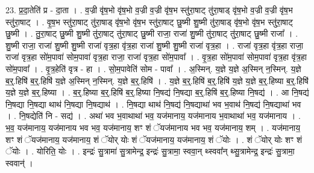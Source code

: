 \documentclass[17pt]{extarticle}
\begin{document}
23. प्र॒दा॒तेति॑ प्र - दा॒ता । . व॒ज्री वृ॑ष॒भो वृ॑ष॒भो व॒ज्री व॒ज्री वृ॑ष॒भ स्तु॑रा॒षाट् तु॑रा॒षाड् वृ॑ष॒भो व॒ज्री व॒ज्री वृ॑ष॒भ स्तु॑रा॒षाट् । . वृ॒ष॒भ स्तु॑रा॒षाट् तु॑रा॒षाड् वृ॑ष॒भो वृ॑ष॒भ स्तु॑रा॒षाट् छु॒ष्मी शु॒ष्मी तु॑रा॒षाड् वृ॑ष॒भो वृ॑ष॒भ स्तु॑रा॒षाट् छु॒ष्मी । . तु॒रा॒षाट् छु॒ष्मी शु॒ष्मी तु॑रा॒षाट् तु॑रा॒षाट् छु॒ष्मी राजा॒ राजा॑ शु॒ष्मी तु॑रा॒षाट् तु॑रा॒षाट् छु॒ष्मी राजा᳚ । . शु॒ष्मी राजा॒ राजा॑ शु॒ष्मी शु॒ष्मी राजा॑ वृत्र॒हा वृ॑त्र॒हा राजा॑ शु॒ष्मी शु॒ष्मी राजा॑ वृत्र॒हा । . राजा॑ वृत्र॒हा वृ॑त्र॒हा राजा॒ राजा॑ वृत्र॒हा सो॑म॒पावा॑ सोम॒पावा॑ वृत्र॒हा राजा॒ राजा॑ वृत्र॒हा सो॑म॒पावा᳚ । . वृ॒त्र॒हा सो॑म॒पावा॑ सोम॒पावा॑ वृत्र॒हा वृ॑त्र॒हा सो॑म॒पावा᳚ । . वृ॒त्र॒हेति॑ वृत्र - हा । . सो॒म॒पावेति॑ सोम - पावा᳚ । . अ॒स्मिन्. य॒ज्ञे य॒ज्ञे अ॒स्मिन् न॒स्मिन्. य॒ज्ञे ब॒र्॒.हिषि॑ ब॒र्॒.हिषि॑ य॒ज्ञे अ॒स्मिन् न॒स्मिन्. य॒ज्ञे ब॒र्॒.हिषि॑ । . य॒ज्ञे ब॒र्॒.हिषि॑ ब॒र्॒.हिषि॑ य॒ज्ञे य॒ज्ञे ब॒र्॒.हिष्या ब॒र्॒.हिषि॑ य॒ज्ञे य॒ज्ञे ब॒र्॒.हिष्या । . ब॒र्॒.हिष्या ब॒र्॒.हिषि॑ ब॒र्॒.हिष्या नि॒षद्य॑ नि॒षद्या ब॒र्॒.हिषि॑ ब॒र्॒.हिष्या नि॒षद्य॑ । . आ नि॒षद्य॑ नि॒षद्या नि॒षद्या थाथ॑ नि॒षद्या नि॒षद्याथ॑ । . नि॒षद्या थाथ॑ नि॒षद्य॑ नि॒षद्याथा॑ भव भ॒वाथ॑ नि॒षद्य॑ नि॒षद्याथा॑ भव । . नि॒षद्येति॑ नि - सद्य॑ । . अथा॑ भव भ॒वाथाथा॑ भव॒ यज॑मानाय॒ यज॑मानाय भ॒वाथाथा॑ भव॒ यज॑मानाय । . भ॒व॒ यज॑मानाय॒ यज॑मानाय भव भव॒ यज॑मानाय॒ शꣳ शं ॅयज॑मानाय भव भव॒ यज॑मानाय॒ शम् । . यज॑मानाय॒ शꣳ शं ॅयज॑मानाय॒ यज॑मानाय॒ शं ॅयोर् योः शं ॅयज॑मानाय॒ यज॑मानाय॒ शं ॅयोः । . शं ॅयोर् योः शꣳ शं ॅयोः । . योरिति॒ योः । . इन्द्रः॑ सु॒त्रामा॑ सु॒त्रामेन्द्र॒ इन्द्रः॑ सु॒त्रामा॒ स्ववा॒न् थ्स्ववा᳚न् थ्सु॒त्रामेन्द्र॒ इन्द्रः॑ सु॒त्रामा॒ स्ववान्॑ । \newline
\end{document}
